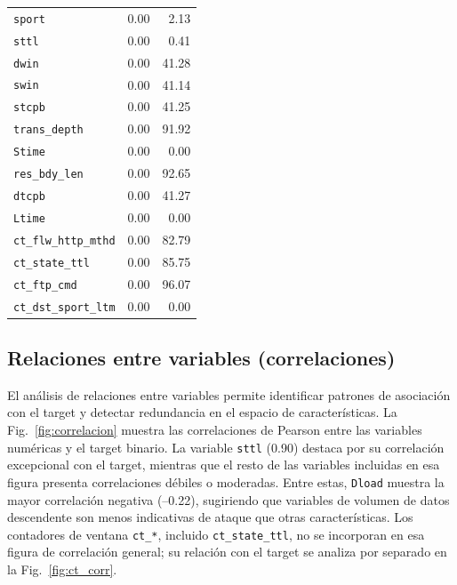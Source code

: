 \documentclass[conference]{IEEEtran}
\begin{document}
\begin{table}[h!]
\begin{tabular}{lrr}
\texttt{sport}             & 0.00  & 2.13  \\
\texttt{sttl}              & 0.00  & 0.41  \\
\texttt{dwin}              & 0.00  & 41.28 \\
\texttt{swin}              & 0.00  & 41.14 \\
\texttt{stcpb}             & 0.00  & 41.25 \\
\texttt{trans\_depth}      & 0.00  & 91.92 \\
\texttt{Stime}             & 0.00  & 0.00  \\
\texttt{res\_bdy\_len}     & 0.00  & 92.65 \\
\texttt{dtcpb}             & 0.00  & 41.27 \\
\texttt{Ltime}             & 0.00  & 0.00  \\
\texttt{ct\_flw\_http\_mthd} & 0.00 & 82.79 \\
\texttt{ct\_state\_ttl}    & 0.00  & 85.75 \\
\texttt{ct\_ftp\_cmd}      & 0.00  & 96.07 \\
\texttt{ct\_dst\_sport\_ltm} & 0.00 & 0.00  \\
\hline
\end{tabular}
\end{table}

\FloatBarrier

\subsection{Relaciones entre variables (correlaciones)}

\FloatBarrier

El análisis de relaciones entre variables permite identificar patrones de asociación con el target y detectar redundancia en el espacio de características. La Fig.~\ref{fig:correlacion} muestra las correlaciones de Pearson entre las variables numéricas y el target binario. La variable \texttt{sttl} (0.90) destaca por su correlación excepcional con el target, mientras que el resto de las variables incluidas en esa figura presenta correlaciones débiles o moderadas. Entre estas, \texttt{Dload} muestra la mayor correlación negativa (--0.22), sugiriendo que variables de volumen de datos descendente son menos indicativas de ataque que otras características. Los contadores de ventana \texttt{ct\_*}, incluido \texttt{ct\_state\_ttl}, no se incorporan en esa figura de correlación general; su relación con el target se analiza por separado en la Fig.~\ref{fig:ct_corr}.
\end{document}
